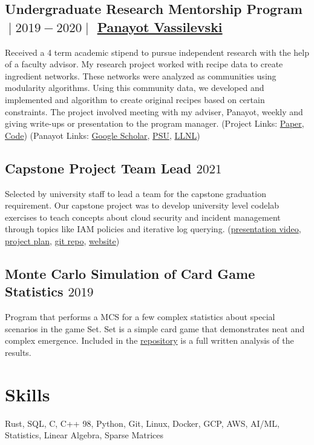 \documentclass{article}
\begin{document}
\subsection{Undergraduate Research Mentorship Program $\;\vert\;2019-2020\;\vert\;$ \href{https://scholar.google.com/citations?user=GhpkHDAAAAAJ&hl=en}{Panayot Vassilevski}}
Received a 4 term academic stipend to pursue independent research with the help of a faculty advisor.
My research project worked with recipe data to create ingredient networks. 
These networks were analyzed as communities using modularity algorithms. Using this community data,
we developed and implemented and algorithm to create original recipes based on certain constraints.
The project involved meeting with my adviser, Panayot, weekly and giving write-ups or presentation to the program manager.
(Project Links: \href{https://raw.githubusercontent.com/aujxn/research/master/paper/Cullinary_Computation_paper.pdf}{Paper}, \href{https://github.com/aujxn/recipe_analysis}{Code})
(Panayot Links: \href{https://scholar.google.com/citations?user=GhpkHDAAAAAJ&hl=en}{Google Scholar}, \href{http://web.pdx.edu/~panayot/}{PSU}, \href{https://people.llnl.gov/vassilevski1}{LLNL})

\subsection{Capstone Project Team Lead $2021$}
Selected by university staff to lead a team for the capstone graduation requirement. Our
capstone project was to develop university level codelab exercises to teach concepts about cloud security
and incident management through topics like IAM policies and iterative log querying.
(\href{https://www.youtube.com/watch?v=hFRoQ-CNmKI}{presentation video}, \href{https://storage.googleapis.com/website_source/resources/capstone.pdf}{project plan}, \href{https://github.com/NicholasSpringer/thunder-ctf/tree/master/core/levels/defender}{git repo}, \href{https://asokamoto.github.io/CloudAuditCTFs/}{website})

\subsection{Monte Carlo Simulation of Card Game Statistics $2019$}
Program that performs a MCS for a few complex statistics about special scenarios in the game Set. Set is a simple card game that demonstrates neat
and complex emergence. Included in the \href{https://github.com/aujxn/set_game_simulator}{repository} is a full written analysis of the results.

\section{Skills}
Rust, SQL, C, C++ 98, Python, Git, Linux, Docker, GCP, AWS, AI/ML, Statistics, Linear Algebra, Sparse Matrices
\end{document}
